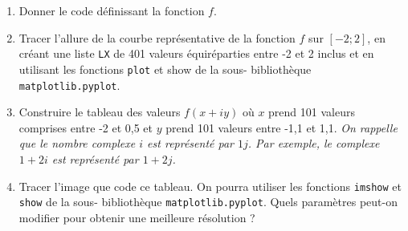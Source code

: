 \documentclass[10pt,fleqn]{article} %
\begin{document}
\begin{multicols}{2}
\begin{enumerate}
\item  Donner le code définissant la fonction $f$.
\item  Tracer l’allure de la courbe représentative de la fonction $f$ sur $[-2; 2]$, en créant une liste \texttt{LX} de 401 valeurs équiréparties entre -2 et 2 inclus et en utilisant les fonctions \texttt{plot} et show de la sous-
bibliothèque \texttt{matplotlib.pyplot}.
\item  Construire le tableau des valeurs $f(x+i y)$ où $x$ prend 101 valeurs comprises entre -2 et 0,5 et $y$ prend
101 valeurs entre -1,1 et 1,1. \textit{On rappelle que le nombre complexe $i$ est représenté par $1j$. Par exemple,
le complexe $1 + 2 i$ est représenté par $1+2j$.}
\item  Tracer l’image que code ce tableau. On pourra utiliser les fonctions \texttt{imshow} et \texttt{show} de la sous-
bibliothèque \texttt{matplotlib.pyplot}. Quels paramètres peut-on modifier pour obtenir une meilleure résolution ?
\end{enumerate}


\end{multicols}
\end{document}
